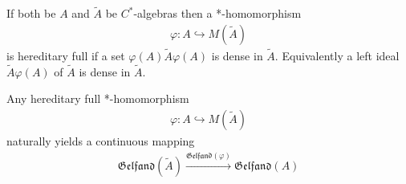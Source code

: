 \documentclass{beamer}
\theoremstyle{plain}
\newcommand{\bean}{\begin{eqnarray*}}
\newcommand{\eean}{\end{eqnarray*}}
\newcommand{\hookto}{\hookrightarrow}        %
\begin{document}
\begin{frame}
\begin{definition}\label{hereditary_extension_defn}
	If both be $A$ and $\widetilde{A}$ be $C^*$-algebras then  a *-homomorphism
	\bean
	\varphi: A \hookto M\left(\widetilde A\right)
	\eean
	is  \alert{hereditary full} if a set $\varphi\left( A\right) \widetilde{A} \varphi\left(A \right)$ is dense in  $\widetilde A$. Equivalently a left ideal $\widetilde{A} \varphi\left(A \right)$  of $\widetilde{A}$ is dense in $\widetilde{A}$.
\end{definition}



\begin{lemma}\label{lolale_lem}
	Any hereditary full  *-homomorphism 	
	\bean
	\varphi: A \hookto M\left(\widetilde A\right)
	\eean
	naturally yields a continuous mapping 
	\bean
	\mathfrak{Gelfand}\left(\widetilde A \right)\xrightarrow{\mathfrak{Gelfand}\left(\varphi \right)}\mathfrak{Gelfand}\left(A \right)
	\eean
\end{lemma}

\end{frame}
\end{document}
